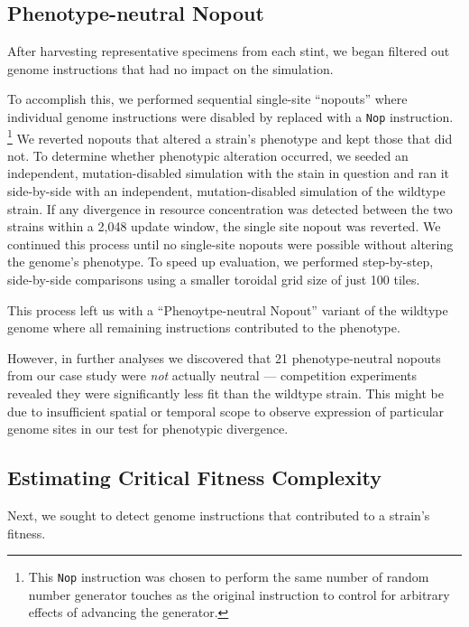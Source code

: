 \subsection{Phenotype-neutral Nopout}

After harvesting representative specimens from each stint, we began filtered out genome instructions that had no impact on the simulation.

To accomplish this, we performed sequential single-site ``nopouts'' where individual genome instructions were disabled by replaced with a \texttt{Nop} instruction.
\footnote{
This \texttt{Nop} instruction was chosen to perform the same number of random number generator touches as the original instruction to control for arbitrary effects of advancing the generator.
}
We reverted nopouts that altered a strain's phenotype and kept those that did not.
To determine whether phenotypic alteration occurred, we seeded an independent, mutation-disabled simulation with the stain in question and ran it side-by-side with an independent, mutation-disabled simulation of the wildtype strain.
If any divergence in resource concentration was detected between the two strains within a 2,048 update window, the single site nopout was reverted.  
We continued this process until no single-site nopouts were possible without altering the genome's phenotype.
To speed up evaluation, we performed step-by-step, side-by-side comparisons using a smaller toroidal grid size of just 100 tiles.

This process left us with a ``Phenoytpe-neutral Nopout'' variant of the wildtype genome where all remaining instructions contributed to the phenotype.

However, in further analyses we discovered that 21 phenotype-neutral nopouts from our case study were \textit{not} actually neutral --- competition experiments revealed they were significantly less fit than the wildtype strain.
This might be due to insufficient spatial or temporal scope to observe expression of particular genome sites in our test for phenotypic divergence.

\subsection{Estimating Critical Fitness Complexity}

Next, we sought to detect genome instructions that contributed to a strain's fitness.

